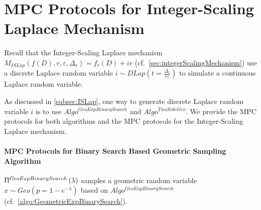 
                  \section{MPC Protocols for Integer-Scaling Laplace Mechanism}
                  \label{sec:MPCProtocolsforInteger-ScalingLaplaceMechanism}
                  Recall that the Integer-Scaling Laplace mechanism $M_{ISLap}\left(f\left(D\right),r,\varepsilon,\Delta _r\right)=f_r\left(D\right) +ir$ (cf.~\autoref{sec:integerScalingMechanism}) use a discrete Laplace random variable $i \sim DLap\left(t=\frac{\Delta_r}{r\varepsilon}\right) $ to simulate a continuous Laplace random variable.

                  As discussed in \autoref{subsec:ISLap}, one way to generate discrete Laplace random variable $i$ is to use $Algo^{GeoExpBinarySearch}$ and $Algo^{TwoSideGeo}$.
                  We provide the MPC protocols for both algorithms and the MPC protocols for the Integer-Scaling Laplace mechanism.

                  \paragraph{MPC Protocols for Binary Search Based Geometric Sampling Algorithm}
                  \label{para::MPCProtocolsforBinarySearchBasedGeometricSamplingAlgorithm}
            $\Uppi^{GeoExpBinarySearch}\left(\lambda\right) $ samples a geometric random variable $x\sim Geo\left(p=1-e^{-\lambda}\right) $ based on $Algo^{GeoExpBinarySearch}$ (cf.~\autoref{algo:GeometricExpBinarySearch}).

